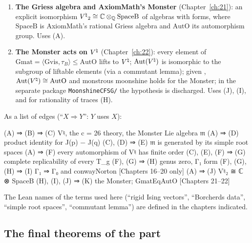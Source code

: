 \begin{enumerate}[label=(\Alph*)]
  \textbf{assembly}  (Chapter~\ref{ch:20}; recorded in \S\ref{ch16:sec:final}).  Uses (F), (G), (H).
\item\label{ch16:node:J} \textbf{The Griess algebra and AxiomMath's Monster} (Chapter~\ref{ch:21}): an explicit
  isomorphism ${V^{\natural}}_2\cong{\mathbb{C}}\otimes_{\mathbb{Q}}\mathrm{SpaceB}$ of algebras with forms, where $\mathrm{SpaceB}$ is AxiomMath's
  rational Griess algebra and $\mathrm{AutO}$ its automorphism group.  Uses (A).
\item\label{ch16:node:K} \textbf{The Monster acts on ${V^{\natural}}$} (Chapter~\ref{ch:22}): every element of
  $\mathrm{Gmat}=\langle\mathrm{Gvis},\tau_B\rangle\le\mathrm{AutO}$ lifts to ${V^{\natural}}$; $\operatorname{Aut}({V^{\natural}})$ is isomorphic to the
  subgroup of liftable elements (via a commutant lemma); given , $\operatorname{Aut}({V^{\natural}})\cong\mathrm{AutO}$ and
  monstrous moonshine holds for the Monster; in the separate package \texttt{MoonshineCFSG/} the hypothesis is
  discharged.
  Uses (J), (I), and for rationality of traces (H).
\end{enumerate}
As a list of edges (``$X\Rightarrow Y$'': $Y$ uses $X$):
\begin{plaincode}
(A) ⇒ (B) ⇒ (C)                    V♮, the c = 26 theory, the Monster Lie algebra 𝔪
(A) ⇒ (D)                          product identity for J(p) − J(q)
(C), (D) ⇒ (E)                     𝔪 is generated by its simple root spaces
(A) ⇒ (F)                          every automorphism of V♮ has finite order
(C), (E), (F) ⇒ (G)                complete replicability of every T_g
(F), (G) ⇒ (H)                     genus zero, Γ₁ form
(F), (G), (H) ⇒ (I)                Γ₁ ⇒ Γ₀ and conwayNorton        [Chapters 16–20 only]
(A) ⇒ (J)                          V♮₂ ≅ ℂ ⊗ SpaceB
(H), (I), (J) ⇒ (K)                the Monster; GmatEqAutO          [Chapters 21–22]
\end{plaincode}
The Lean names of the terms used here (``rigid Ising vectors'', ``Borcherds data'', ``simple root spaces'', ``commutant
lemma'') are defined in the chapters indicated.

\subsection{The final theorems of the part}


